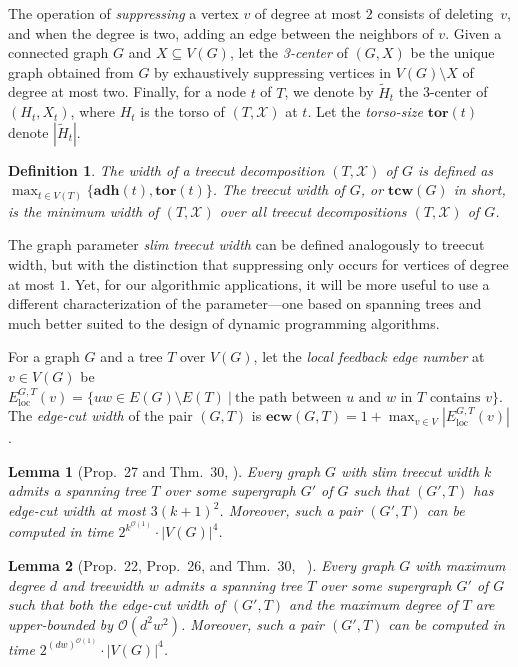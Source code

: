 \documentclass[letterpaper]{article} %
\newcommand{\bigoh}{\ensuremath{{\mathcal O}}}
\newtheorem{lemma}{Lemma}
\newtheorem{definition}{Definition}
\newcommand{\adh}{{\mathbf{adh}}}
\newcommand{\tor}{{\mathbf{tor}}}
\newcommand{\tcw}{{\mathbf{tcw}}}
\newcommand{\ecw}{{\mathbf{ecw}}}
\newcommand{\loc}{\operatorname{loc}}
\begin{document}
The operation of {\em suppressing} a vertex $v$ of degree at most $2$ consists of deleting~$v$, and when the degree is two, adding an edge between the neighbors of $v$. Given a connected graph $G$ and  $X\subseteq V(G)$, let the {\em 3-center} of $(G,X)$ be the unique graph obtained from $G$ by exhaustively suppressing vertices in $V(G) \setminus X$ of degree at most two. Finally, for a node $t$ of $T$, we denote by $\tilde{H}_t$ the 3-center of $(H_t,X_t)$, where $H_t$ is the torso of $(T,\mathcal{X})$ at $t$. Let the \emph{torso-size} $\tor(t)$ denote $|\tilde{H}_t|$.

\begin{definition}
The width of a treecut decomposition $(T,\mathcal{X})$ of $G$ is defined as $\max_{t\in V(T)}\{ \adh(t), \tor(t) \}$. The treecut width of $G$, or $\tcw(G)$ in short, is the minimum width of $(T,\mathcal{X})$ over all treecut decompositions $(T,\mathcal{X})$ of $G$.
\end{definition}

The graph parameter \emph{slim treecut width} can be defined analogously to treecut width, but with the distinction that suppressing only occurs for vertices of degree at most $1$. Yet, for our algorithmic applications, it will be more useful to use a different characterization of the parameter---one based on spanning trees and much better suited to the design of dynamic programming algorithms.

For a graph $G$ and a tree $T$ over $V(G)$, let the \emph{local feedback edge number} at $v\in V(G)$ be $E_{\loc}^{G,T}(v)=\{uw\in E(G)\setminus E(T)~|~\text{the path between $u$ and  $w$ in $T$ contains }v\}.$
The \emph{edge-cut width} of the pair $(G,T)$ is $\ecw(G,T)=1+\max_{v\in V} |E_{\loc}^{G,T}(v)|$.

\begin{lemma}[Prop.\ 27 and Thm.\ 30, \citeauthor{GanianK22} \citeyear{GanianK22}]
\label{lem:computestcw}
Every graph $G$ with slim treecut width $k$ admits a spanning tree $T$ over some supergraph $G'$ of $G$ such that $(G',T)$ has edge-cut width at most $3(k+1)^2$. Moreover, such a pair $(G',T)$ can be computed in time $2^{k^{\bigoh(1)}}\cdot |V(G)|^4$.
\end{lemma}

\begin{lemma}[Prop.\ 22, Prop.\ 26, and Thm.\ 30,~\citeauthor{GanianK22} \citeyear{GanianK22}]
\label{lem:0tcw}
Every graph $G$ with maximum degree $d$ and treewidth $w$ admits a spanning tree $T$ over some supergraph $G'$ of $G$ such that both the edge-cut width of $(G',T)$ and the maximum degree of $T$ are upper-bounded by $\bigoh(d^2w^2)$. Moreover, such a pair $(G',T)$ can be computed in time $2^{(dw)^{\bigoh(1)}}\cdot |V(G)|^4$.
\end{lemma}
\end{document}
